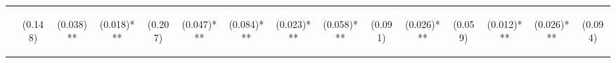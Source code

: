 \begin{center}
\begin{tabular}{lcccccccccccccc}
\hline  & \begin{normalsize}(0.148)\end{normalsize} & \begin{normalsize}(0.038)**\end{normalsize} & \begin{normalsize}(0.018)***\end{normalsize} & \begin{normalsize}(0.207)\end{normalsize} & \begin{normalsize}(0.047)***\end{normalsize} & \begin{normalsize}(0.084)***\end{normalsize} & \begin{normalsize}(0.023)***\end{normalsize} & \begin{normalsize}(0.058)***\end{normalsize} & \begin{normalsize}(0.091)\end{normalsize} & \begin{normalsize}(0.026)***\end{normalsize} & \begin{normalsize}(0.059)\end{normalsize} & \begin{normalsize}(0.012)***\end{normalsize} & \begin{normalsize}(0.026)***\end{normalsize} & \begin{normalsize}(0.094)\end{normalsize}\\

\end{tabular}
\end{center}
